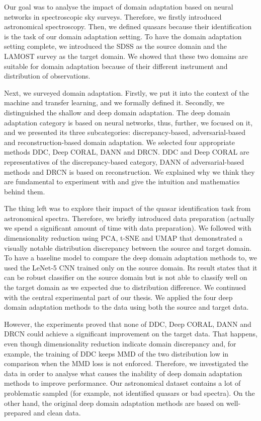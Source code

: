 \documentclass[thesis=M,english]{FITthesis}[2012/10/20]
\begin{document}
Our goal was to analyse the impact of domain adaptation based on neural networks in spectroscopic sky surveys.
Therefore, we firstly introduced astronomical spectroscopy.
Then, we defined quasars because their identification is the task of our domain adaptation setting.
To have the domain adaptation setting complete,
we introduced the SDSS as the source domain and the LAMOST survey as the target domain.
We showed that these two domains are suitable for domain adaptation
because of their different instrument and distribution of observations.

Next, we surveyed domain adaptation.
Firstly, we put it into the context of the machine and transfer learning,
and we formally defined it.
Secondly, we distinguished the shallow and deep domain adaptation.
The deep domain adaptation category is based on neural networks,
thus, further, we focused on it, and we presented its three subcategories:
discrepancy-based, adversarial-based and reconstruction-based domain adaptation.
We selected four appropriate methods DDC, Deep CORAL, DANN and DRCN.
DDC and Deep CORAL are representatives of the discrepancy-based category, DANN of adversarial-based methods and DRCN is based on reconstruction.
We explained why we think they are fundamental to experiment with
and give the intuition and mathematics behind them.

The thing left was to explore their impact of the quasar identification task from astronomical spectra.
Therefore, we briefly introduced data preparation
(actually we spend a significant amount of time with data preparation).
We followed with dimensionality reduction using PCA, t-SNE and UMAP
that demonstrated a visually notable distribution discrepancy between the source and target domain.
To have a baseline model to compare the deep domain adaptation methods to,
we used the LeNet-5 CNN trained only on the source domain.
Its result states that it can be robust classifier on the source domain
but is not able to classify well on the target domain as we expected due to distribution difference.
We continued with the central experimental part of our thesis.
We applied the four deep domain adaptation methods to the data using both the source and target data.

However, the experiments proved that none of DDC, Deep CORAL, DANN and DRCN could achieve a significant improvement on the target data.
That happens, even though dimensionality reduction indicate domain discrepancy
and, for example, the training of DDC keeps MMD of the two distribution low in comparison when the MMD loss is not enforced.
Therefore, we investigated the data in order to analyse
what causes the inability of deep domain adaptation methods to improve performance.
Our astronomical dataset contains a lot of problematic sampled
(for example, not identified quasars or bad spectra).
On the other hand, the original deep domain adaptation methods are based on well-prepared and clean data.
\end{document}
